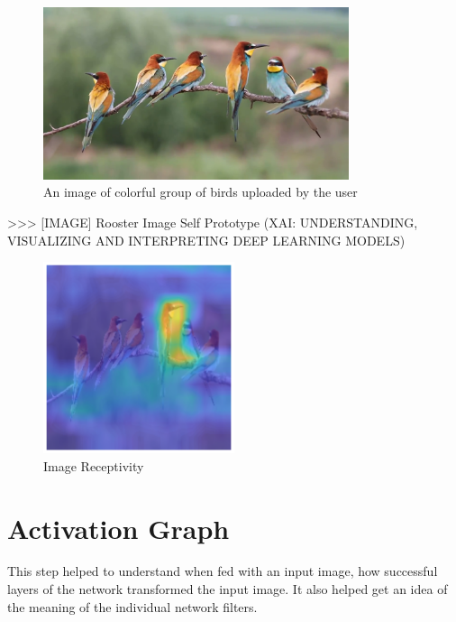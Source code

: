 \begin{figure}[htbp]
\centering
\includegraphics[width=0.80\textwidth]{images/colorful-group-of-birds-get-together_vkmuak6_e__F0000.png}
\caption{An image of colorful group of birds uploaded by the user}
\label{fig:myFig}
\end{figure}

>>> [IMAGE] Rooster Image Self Prototype (XAI: UNDERSTANDING, VISUALIZING AND INTERPRETING DEEP LEARNING MODELS)

\begin{figure}[htbp]
\centering
\includegraphics[width=0.50\textwidth]{images/heatmap-class-activations.png}
\caption{Image Receptivity}
\label{fig:heatmap-1}
\end{figure}

\section*{Activation Graph}

This step helped to understand when fed with an input image, how successful layers of the network transformed the input image. It also helped get an idea of the meaning of the individual network filters.

\iffalse
